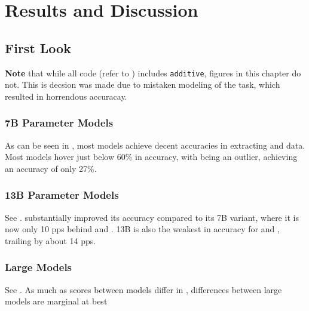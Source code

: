 \chapter{Results and Discussion}\label{chap:results}






\section{First Look}\label{sec:result:first}
\textbf{Note} that while all code (refer to ) includes \texttt{additive}, figures in this chapter do not.
This is decsion was made due to mistaken modeling of the task, which resulted in horrendous accuracay.

\subsection{7B Parameter Models}\label{sub:result:7b}
As can be seen in , most models achieve decent accuracies in extracting \ttemp and \ttime data.
Most models hover just below 60\% in \tsolv accuracy, with  being an outlier, achieving an accuracy of only 27\%.

\subsection{13B Parameter Models}\label{sub:result:13b}
See . 
 substantially improved its \tsolv accuracy compared to its 7B variant, where it is now only 10 \glspl{pp} behind  and .
 13B is also the weakest in accuracy for \ttemp and \ttime, trailing by about 14 \glspl{pp}.

\subsection{Large Models}\label{sub:result:large}
See . As much as scores between models differ in , differences between large models are marginal at best

